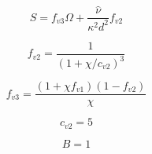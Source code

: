 

\begin{equation}
\hat S = f_{v3} \Omega + \frac{\hat \nu}{\kappa^2 d^2} f_{v2}
\end{equation}

\begin{equation}
f_{v2} = \frac{1}{(1+\chi/c_{v2})^3}
\end{equation}

\begin{equation}
f_{v3} = \frac{(1+\chi f_{v1})(1-f_{v2})}{\chi}
\end{equation}

\begin{equation}
c_{v2} = 5
\end{equation}

\begin{equation}
B=1
\end{equation}


